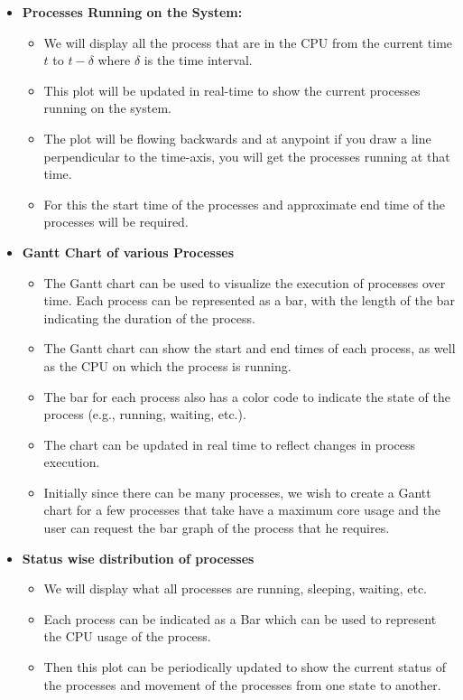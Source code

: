 \documentclass[12pt]{article}
\begin{document}
\begin{itemize}
    \item {\bf Processes Running on the System:}
    \begin{itemize}
        \item We will display all the process that are in the CPU from the current time $t$ to $t - \delta$ where $\delta$ is the time interval.
        \item This plot will be updated in real-time to show the current processes running on the system.
        \item The plot will be flowing backwards and at anypoint if you draw a line perpendicular to the time-axis, you will get the processes running at that time.
        \item For this the start time of the processes and approximate end time of the processes will be required.
    \end{itemize}
    \item {\bf Gantt Chart of various Processes}
    \begin{itemize}
        \item The Gantt chart can be used to visualize the execution of processes over time. Each process can be represented as a bar, with the length of the bar indicating the duration of the process.
        \item The Gantt chart can show the start and end times of each process, as well as the CPU on which the process is running.
        \item The bar for each process also has a color code to indicate the state of the process (e.g., running, waiting, etc.).
        \item The chart can be updated in real time to reflect changes in process execution.
        \item Initially since there can be many processes, we wish to create a Gantt chart for a few processes that take have a maximum core usage and the user can request the bar graph of the process that he requires.
    \end{itemize}
    \item {\bf Status wise distribution of processes}
    \begin{itemize}
        \item We will display what all processes are running, sleeping, waiting, etc.
        \item Each process can be indicated as a Bar which can be used to represent the CPU usage of the process.
        \item Then this plot can be periodically updated to show the current status of the processes and movement of the processes from one state to another.

\end{itemize}
\end{itemize}
\end{document}
